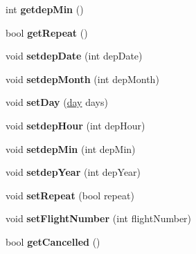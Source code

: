 \begin{DoxyCompactItemize}
\item 
\hypertarget{classschedule_ac73eb663a5152f7ac2b84784b1d02c42}{
int {\bfseries getdepMin} ()}
\label{classschedule_ac73eb663a5152f7ac2b84784b1d02c42}

\item 
\hypertarget{classschedule_a6b8d60e7ad5ad6800834655e197d5b94}{
bool {\bfseries getRepeat} ()}
\label{classschedule_a6b8d60e7ad5ad6800834655e197d5b94}

\item 
\hypertarget{classschedule_ae6a17a326a61bb56a35d560ac8b19f30}{
void {\bfseries setdepDate} (int depDate)}
\label{classschedule_ae6a17a326a61bb56a35d560ac8b19f30}

\item 
\hypertarget{classschedule_aaf4c9cd5c3df98771a1a4b2fd7f9bdfa}{
void {\bfseries setdepMonth} (int depMonth)}
\label{classschedule_aaf4c9cd5c3df98771a1a4b2fd7f9bdfa}

\item 
\hypertarget{classschedule_a22e87219c8294e9de8fbdaa54774b055}{
void {\bfseries setDay} (\hyperlink{classday}{day} days)}
\label{classschedule_a22e87219c8294e9de8fbdaa54774b055}

\item 
\hypertarget{classschedule_a2ed0c928e820268243f50e87a9d3152b}{
void {\bfseries setdepHour} (int depHour)}
\label{classschedule_a2ed0c928e820268243f50e87a9d3152b}

\item 
\hypertarget{classschedule_a4388423852353550ad95e951a6d1a87e}{
void {\bfseries setdepMin} (int depMin)}
\label{classschedule_a4388423852353550ad95e951a6d1a87e}

\item 
\hypertarget{classschedule_a930696bed176346d64fbf7b70ad28f5c}{
void {\bfseries setdepYear} (int depYear)}
\label{classschedule_a930696bed176346d64fbf7b70ad28f5c}

\item 
\hypertarget{classschedule_ab3062e5b711d0598e8270d5dc2f691f5}{
void {\bfseries setRepeat} (bool repeat)}
\label{classschedule_ab3062e5b711d0598e8270d5dc2f691f5}

\item 
\hypertarget{classschedule_adae2e2ee17f360191a634f5aeaa89f40}{
void {\bfseries setFlightNumber} (int flightNumber)}
\label{classschedule_adae2e2ee17f360191a634f5aeaa89f40}

\item 
\hypertarget{classschedule_ae160184dd016a73d9b1c84473a4c6136}{
bool {\bfseries getCancelled} ()}
\label{classschedule_ae160184dd016a73d9b1c84473a4c6136}


\end{DoxyCompactItemize}
